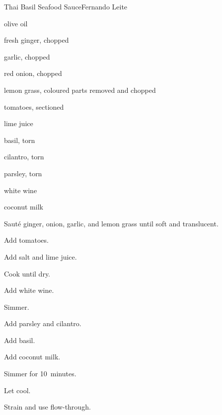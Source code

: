 \begin{recipe}{Thai Basil Seafood Sauce}{Fernando Leite}{}

\begin{ingredients}
\item olive oil
\item fresh ginger, chopped
\item garlic, chopped
\item red onion, chopped
\item lemon grass, coloured parts removed and chopped
\item tomatoes, sectioned
\item lime juice
\item {} basil, torn
\item \C{\half} cilantro, torn
\item \C{\half} parsley, torn
\item \C{\quarter} white wine
\item \C{\half} coconut milk
\end{ingredients}

\begin{directions}
\item Saut\'e ginger, onion, garlic, and lemon grass until soft and translucent.
\item Add tomatoes.
\item Add salt and lime juice.
\item Cook until dry.
\item Add white wine.
\item Simmer.
\item Add parsley and cilantro.
\item Add basil.
\item Add coconut milk.
\item Simmer for 10~minutes.
\item Let cool.
\item Strain and use flow-through.
\end{directions}

\end{recipe}
